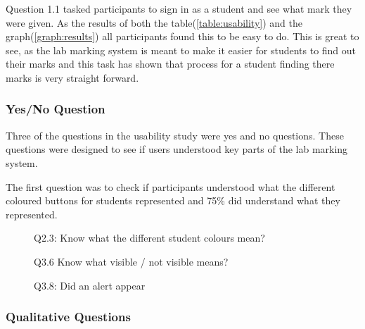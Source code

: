 \documentclass[12pt]{article}  %
\begin{document}
Question 1.1 tasked participants to sign in as a student and see what mark they were given. As the results of both the table(\ref{table:usability}) and the graph(\ref{graph:results}) all participants found this to be easy to do. This is great to see, as the lab marking system is meant to make it easier for students to find out their marks and this task has shown that process for a student finding there marks is very straight forward.


\subsubsection*{Yes/No Question}
Three of the questions in the usability study were yes and no questions. These questions were designed to see if users understood key parts of the lab marking system.

The first question was to check if participants understood what the different coloured buttons for students represented and 75\% did understand what they represented. 

\begin{figure}[H]
\caption{Q2.3: Know what the different student colours mean?}


\end{figure}



\begin{figure}[H]
\caption{Q3.6 Know what visible / not visible means?}


\end{figure}


\begin{figure}[H]
\caption{Q3.8: Did an alert appear}


\end{figure}


\subsubsection{Qualitative Questions}
\end{document}

